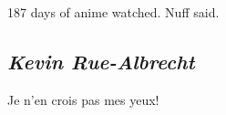 \documentclass[
]{book}
\begin{document}
187 days of anime watched.
Nuff said.

\hypertarget{kevin-rue-albrecht}{%
\subsection*{\texorpdfstring{\emph{Kevin Rue-Albrecht}}{Kevin Rue-Albrecht}}\label{kevin-rue-albrecht}}

Je n'en crois pas mes yeux!

  
\end{document}
